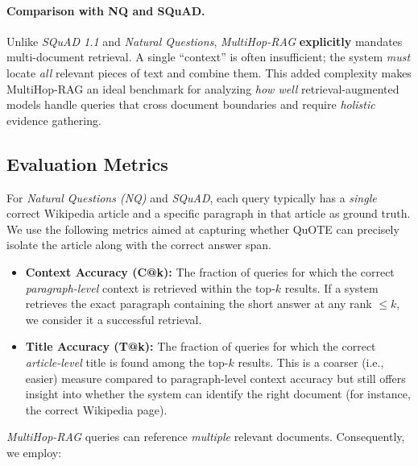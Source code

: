 \paragraph{Comparison with NQ and SQuAD.}
Unlike \emph{SQuAD 1.1}  and \emph{Natural Questions}, \emph{MultiHop-RAG} \textbf{explicitly} mandates multi-document retrieval. 
A single ``context'' is often insufficient; the system \emph{must} locate \emph{all} relevant pieces of text and combine them. 
This added complexity makes MultiHop-RAG an ideal benchmark for analyzing \emph{how well} retrieval-augmented models handle queries 
that cross document boundaries and require \emph{holistic} evidence gathering.
\fi








\subsection{Evaluation Metrics}
\label{subsec:nq-metrics}
For \emph{Natural Questions (NQ)}
and \emph{SQuAD},
each query typically has a \emph{single} correct Wikipedia article and a specific paragraph in that article as ground truth. 
We use the following metrics aimed at capturing whether QuOTE can precisely isolate the article along with the correct answer span.

\begin{itemize}
    \item \textbf{Context Accuracy (C@k):} The fraction of queries for which the correct \emph{paragraph-level} context 
    is retrieved within the top-$k$ results. If a system retrieves the exact paragraph containing the short
    answer at any rank $\le k$, we consider it a successful retrieval.

    \item \textbf{Title Accuracy (T@k):} The fraction of queries for which the correct \emph{article-level} title 
    is found among the top-$k$ results. This is a coarser (i.e., easier) measure compared to paragraph-level context accuracy 
    but still offers insight into whether the system can identify the right document (for instance, the correct Wikipedia page).
\end{itemize}

\iffalse
\vspace{1em}




\subsubsection{Evaluation Metrics}
\label{subsec:multihop-metrics}
\fi
\noindent
\emph{MultiHop-RAG} queries can reference \emph{multiple} relevant documents. Consequently, we employ:

